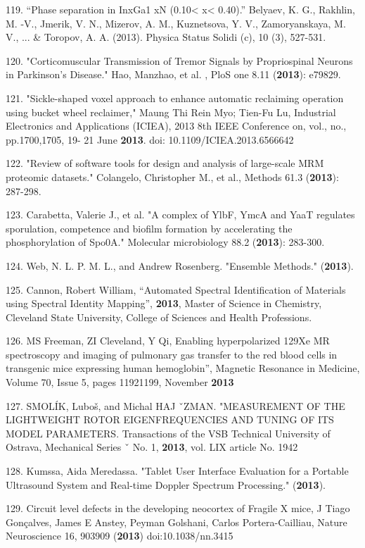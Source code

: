119. ``Phase separation in InxGa1 xN (0.10{\textless} x{\textless} 0.40).'' Belyaev, K. G., Rakhlin, M. -V., Jmerik, V. N., Mizerov, A. M., Kuznetsova, Y. V., Zamoryanskaya, M. V., ... \& Toropov, A. A. (2013). Physica Status Solidi (c), 10 (3), 527-531.

120. "Corticomuscular Transmission of Tremor Signals by Propriospinal Neurons in Parkinson's Disease." Hao, Manzhao, et al. , PloS one 8.11 (\textbf{2013}): e79829.

121. "Sickle-shaped voxel approach to enhance automatic reclaiming operation using bucket wheel reclaimer," Maung Thi Rein Myo; Tien-Fu Lu, Industrial Electronics and Applications (ICIEA), 2013 8th IEEE Conference on, vol., no., pp.1700,1705, 19- 21 June \textbf{2013}. doi: 10.1109/ICIEA.2013.6566642

122. "Review of software tools for design and analysis of large-scale MRM proteomic datasets." Colangelo, Christopher M., et al., Methods 61.3 (\textbf{2013}): 287-298.

123. Carabetta, Valerie J., et al. "A complex of YlbF, YmcA and YaaT regulates sporulation, competence and biofilm formation by accelerating the phosphorylation of Spo0A." Molecular microbiology 88.2 (\textbf{2013}): 283-300.

124. Web, N. L. P. M. L., and Andrew Rosenberg. "Ensemble Methods." (\textbf{2013}).

125. Cannon, Robert William, ``Automated Spectral Identification of Materials using Spectral Identity Mapping'', \textbf{2013}, Master of Science in Chemistry, Cleveland State University, College of Sciences and Health Professions.

126. MS Freeman, ZI Cleveland, Y Qi, Enabling hyperpolarized 129Xe MR spectroscopy and imaging of pulmonary gas transfer to the red blood cells in transgenic mice expressing human hemoglobin'', Magnetic Resonance in Medicine, Volume 70, Issue 5, pages 1192\textendash{}1199, November \textbf{2013}

127. SMOL\'{I}K, Lubo\v{s}, and Michal HAJ ˇZMAN. "MEASUREMENT OF THE LIGHTWEIGHT ROTOR EIGENFREQUENCIES AND TUNING OF ITS MODEL PARAMETERS. Transactions of the VSB \textendash{} Technical University of Ostrava, Mechanical Series ˇ No. 1, \textbf{2013}, vol. LIX article No. 1942

128. Kumssa, Aida Meredassa. "Tablet User Interface Evaluation for a Portable Ultrasound System and Real-time Doppler Spectrum Processing." (\textbf{2013}).

129. Circuit level defects in the developing neocortex of Fragile X mice, J Tiago Gon\c{c}alves, James E Anstey, Peyman Golshani, Carlos Portera-Cailliau, Nature Neuroscience 16, 903\textendash{}909 (\textbf{2013}) doi:10.1038/nn.3415

